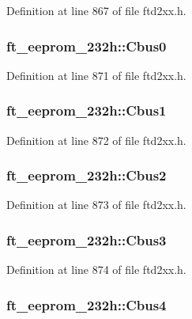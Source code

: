 Definition at line 867 of file ftd2xx.h.\hypertarget{structft__eeprom__232h_aac7c9328aa4b74813b1fbd73a0a6afbd}{
\subsubsection[{Cbus0}]{ {\bf ft\_\-eeprom\_\-232h::Cbus0}}}
\label{structft__eeprom__232h_aac7c9328aa4b74813b1fbd73a0a6afbd}


Definition at line 871 of file ftd2xx.h.\hypertarget{structft__eeprom__232h_ac56f116aab26598caa87cc9ac28376af}{
\subsubsection[{Cbus1}]{ {\bf ft\_\-eeprom\_\-232h::Cbus1}}}
\label{structft__eeprom__232h_ac56f116aab26598caa87cc9ac28376af}


Definition at line 872 of file ftd2xx.h.\hypertarget{structft__eeprom__232h_acf4598ab9a02931e8359ab58308151f8}{
\subsubsection[{Cbus2}]{ {\bf ft\_\-eeprom\_\-232h::Cbus2}}}
\label{structft__eeprom__232h_acf4598ab9a02931e8359ab58308151f8}


Definition at line 873 of file ftd2xx.h.\hypertarget{structft__eeprom__232h_a5dfdd3f1536dbeab687178ceef867c26}{
\subsubsection[{Cbus3}]{ {\bf ft\_\-eeprom\_\-232h::Cbus3}}}
\label{structft__eeprom__232h_a5dfdd3f1536dbeab687178ceef867c26}


Definition at line 874 of file ftd2xx.h.\hypertarget{structft__eeprom__232h_a8c3453711bbeacd04ce19088a760d521}{
\subsubsection[{Cbus4}]{ {\bf ft\_\-eeprom\_\-232h::Cbus4}}}
\label{structft__eeprom__232h_a8c3453711bbeacd04ce19088a760d521}


